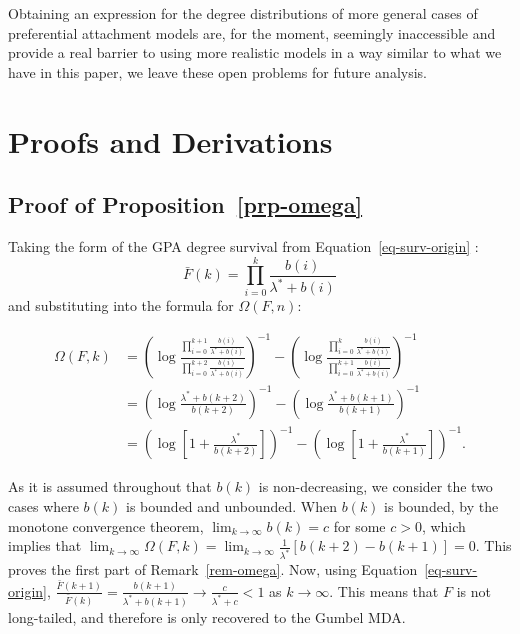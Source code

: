 \documentclass[
  sn-basic,
  10pt,
]{sn-jnl}
\theoremstyle{plain}
\theoremstyle{plain}
\theoremstyle{remark}
\begin{document}
Obtaining an expression for the degree distributions of more general
cases of preferential attachment models are, for the moment, seemingly
inaccessible and provide a real barrier to using more realistic models
in a way similar to what we have in this paper, we leave these open
problems for future analysis.

\setcounter{section}{0}
\renewcommand{\thesection}{\Alph{section}}
\setcounter{table}{0}
\renewcommand{\thetable}{A\arabic{table}}
\setcounter{figure}{0}
\renewcommand{\thefigure}{A\arabic{figure}}

\newpage

\section{Proofs and Derivations}\label{sec-proofs}

\subsection{\texorpdfstring{Proof of
Proposition~\ref{prp-omega}}{Proof of Proposition~}}\label{proof-of-prp-omega}

Taking the form of the GPA degree survival from
Equation~\ref{eq-surv-origin} : \[
\bar F(k) = \prod_{i=0}^k\frac{b(i)}{\lambda^*+b(i)}
\] and substituting into the formula for \(\Omega(F,n)\):

\begin{align*}
\Omega(F,k)&=\left(\log\frac{\prod_{i=0}^{k+1}\frac{b(i)}{\lambda^{*}+b(i)}}{\prod_{i=0}^{k+2}\frac{b(i)}{\lambda^{*}+b(i)}}\right)^{-1}-\left(\log\frac{\prod_{i=0}^{k}\frac{b(i)}{\lambda^{*}+b(i)}}{\prod_{i=0}^{k+1}\frac{b(i)}{\lambda^{*}+b(i)}}\right)^{-1}\\
&=\left(\log\frac{\lambda^{*}+b(k+2)}{b(k+2)}\right)^{-1}-\left(\log\frac{\lambda^{*}+b(k+1)}{b(k+1)}\right)^{-1}\\
&=\left(\log\left[1+\frac{\lambda^{*}}{b(k+2)}\right]\right)^{-1}-\left(\log\left[1+\frac{\lambda^{*}}{b(k+1)}\right]\right)^{-1}.
\end{align*}

As it is assumed throughout that \(b(k)\) is non-decreasing, we consider
the two cases where \(b(k)\) is bounded and unbounded. When \(b(k)\) is
bounded, by the monotone convergence theorem,
\(\lim_{k\rightarrow\infty}b(k) = c\) for some \(c>0\), which implies
that
\(\lim_{k\rightarrow\infty}\Omega(F,k)=\lim_{k\rightarrow\infty}\frac{1}{\lambda^{*}}\left[b(k+2)-b(k+1)\right] = 0\).
This proves the first part of Remark~\ref{rem-omega}. Now, using
Equation~\ref{eq-surv-origin},
\(\frac{\bar{F}(k+1)}{\bar{F}(k)}=\frac{b(k+1)}{\lambda^{*}+b(k+1)}\rightarrow\frac{c}{\lambda^{*}+c}<1\)
as \(k\rightarrow\infty\). This means that \(F\) is not long-tailed, and
therefore is only recovered to the Gumbel MDA.
\end{document}
